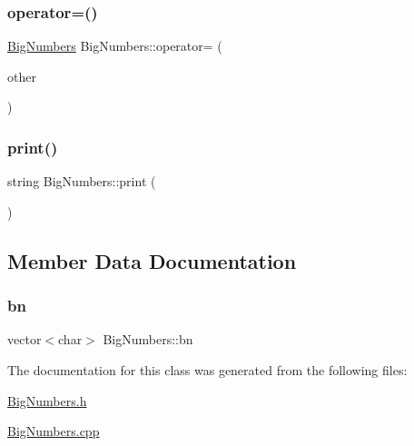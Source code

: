 \mbox{\label{class_big_numbers_a1ff55cbf60eddfeedae51198d3a2cf7d}} 
\subsubsection{\texorpdfstring{operator=()}{operator=()}}
{\footnotesize\ttfamily \mbox{\hyperlink{class_big_numbers}{Big\+Numbers}} Big\+Numbers\+::operator= (\begin{DoxyParamCaption}\item[{const \mbox{\hyperlink{class_big_numbers}{Big\+Numbers}} \&}]{other }\end{DoxyParamCaption})}

\mbox{\label{class_big_numbers_a1d72103bab34ba4c14095a5e069d1d36}} 
\subsubsection{\texorpdfstring{print()}{print()}}
{\footnotesize\ttfamily string Big\+Numbers\+::print (\begin{DoxyParamCaption}{ }\end{DoxyParamCaption})}



\subsection{Member Data Documentation}
\mbox{\label{class_big_numbers_a9c43bc93a372c7c7d9f1eca2f3a5ae9c}} 
\subsubsection{\texorpdfstring{bn}{bn}}
{\footnotesize\ttfamily vector$<$char$>$ Big\+Numbers\+::bn}



The documentation for this class was generated from the following files\+:\begin{DoxyCompactItemize}
\item 
\mbox{\hyperlink{_big_numbers_8h}{Big\+Numbers.\+h}}\item 
\mbox{\hyperlink{_big_numbers_8cpp}{Big\+Numbers.\+cpp}}\end{DoxyCompactItemize}
